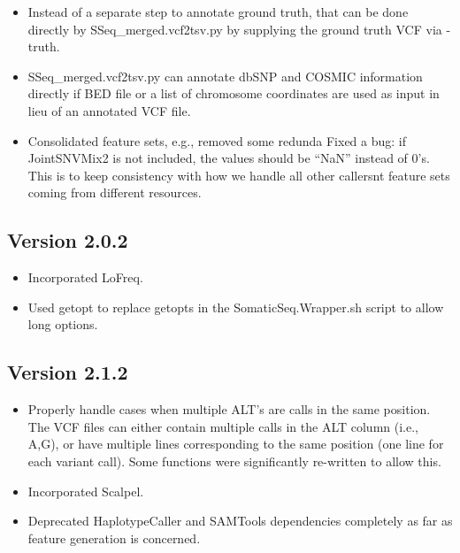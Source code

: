 \documentclass[10pt,letterpaper]{article}
\begin{document}
\begin{sloppypar}
\begin{itemize}
  \item
  Instead of a separate step to annotate ground truth, that can be done directly by SSeq\_merged.vcf2tsv.py by supplying the ground truth VCF via -truth.

  \item
  SSeq\_merged.vcf2tsv.py can annotate dbSNP and COSMIC information directly if BED file or a list of chromosome coordinates are used as input in lieu of an annotated VCF file. 

  \item
  Consolidated feature sets, e.g., removed some redunda
  Fixed a bug: if JointSNVMix2 is not included, the values should be ``NaN'' instead of 0's. This is to keep consistency with how we handle all other callersnt feature sets coming from different resources.
\end{itemize}


\subsection{Version 2.0.2}

\begin{itemize}

  \item
  Incorporated LoFreq.
  
  \item
  Used getopt to replace getopts in the SomaticSeq.Wrapper.sh script to allow long options. 
  
\end{itemize}



\subsection{Version 2.1.2}

\begin{itemize}

  \item
  Properly handle cases when multiple ALT's are calls in the same position. The VCF files can either contain multiple calls in the ALT column (i.e., A,G), or have multiple lines corresponding to the same position (one line for each variant call). Some functions were significantly re-written to allow this.

  \item
  Incorporated Scalpel.
  
  \item
  Deprecated HaplotypeCaller and SAMTools dependencies completely as far as feature generation is concerned.
  

\end{itemize}
\end{sloppypar}
\end{document}
